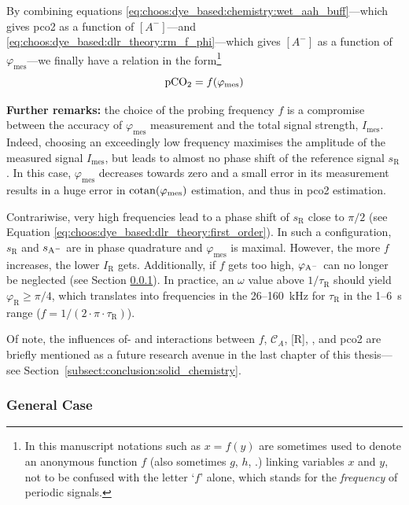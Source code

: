 By combining equations \ref{eq:choos:dye_based:chemistry:wet_aah_buff}---which gives \gls{pco2} as a function of $[A^-]$---and \ref{eq:choos:dye_based:dlr_theory:rm_f_phi}---which gives $[A^-]$ as a function of $\varphi_\text{mes}$---we finally have a relation in the form\footnote{In this manuscript notations such as $x=f(y)$ are sometimes used to denote an anonymous function $f$ (also sometimes $g$, $h$, \etc.) linking variables $x$ and $y$, not to be confused with the letter `$f$' alone, which stands for the \emph{frequency} of periodic signals.}
\begin{equation}
	\ce{pCO_2} = f(\varphi_\text{mes})
\end{equation}

\textbf{Further remarks:} the choice of the probing frequency $f$ is a compromise between the accuracy of $\varphi_\text{mes}$ measurement and the total signal strength, $I_\text{mes}$. Indeed, choosing an exceedingly low frequency maximises the amplitude of the measured signal $I_\text{mes}$, but leads to almost no phase shift of the reference signal $s_\mathrm{R}$. In this case, $\varphi_\text{mes}$ decreases towards zero and a small error in its measurement results in a huge error in $\operatorname{cotan}(\varphi_\text{mes})$ estimation, and thus in \gls{pco2} estimation.

Contrariwise, very high frequencies lead to a phase shift of $s_\mathrm{R}$ close to $\pi/2$ (see Equation \ref{eq:choos:dye_based:dlr_theory:first_order}). In such a configuration, $s_\mathrm{R}$ and $s_\mathrm{A^{\smash{-}}}$ are in phase quadrature and $\varphi_\text{mes}$ is maximal. However, the more $f$ increases, the lower $I_\mathrm{R}$ gets. Additionally, if $f$ gets too high, $\varphi_\mathrm{A^{\smash{-}}}$ can no longer be neglected (see Section \ref{subsect:choos:dye_based:dlr_theory:general_case}). In practice, an $\omega$ value above $1/\tau_\mathrm{R}$ should yield $\varphi_\mathrm{R} \geq \pi/4$, which translates into frequencies in the 26--160~kHz for $\tau_\mathrm{R}$ in the 1--6~\textmu{}s range ($f=1/(2\cdot \pi \cdot \tau_\mathrm{R})$).

Of note, the influences of- and interactions between $f$, $\mathcal{C}_{A}$, [R], \ce{[Q^+]}, and \gls{pco2} are briefly mentioned as a future research avenue in the last chapter of this thesis---see Section~\ref{subsect:conclusion:solid_chemistry}.

\subsubsection{General Case}\label{subsect:choos:dye_based:dlr_theory:general_case}

